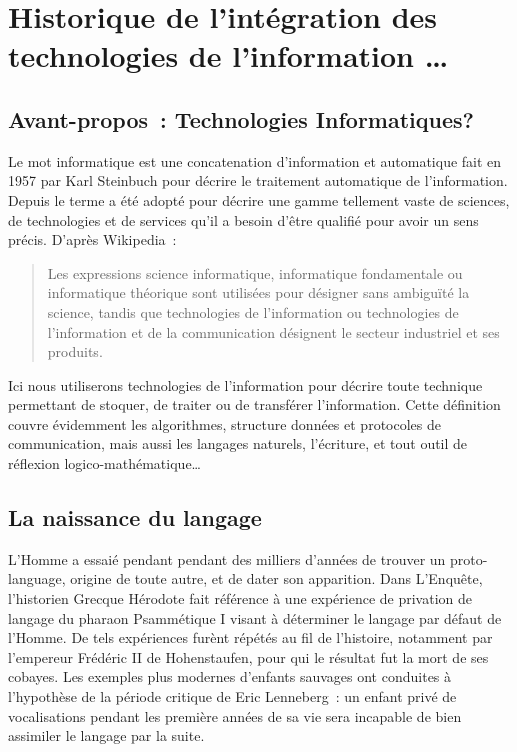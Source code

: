 
\chapter{Historique de l'intégration des technologies de l'information \ldots}\label{quoi}

\section{Avant-propos~: Technologies \og{}Informatiques\fg{}?}

Le mot \og{}informatique\fg{} est une concatenation d'\og{}information\fg{} et \og{}automatique\fg{} fait en 1957 par Karl Steinbuch\cite{steinbuch-2005} pour décrire le traitement automatique de l'information. 
Depuis le terme a été adopté pour décrire une gamme tellement vaste de sciences, de technologies et de services qu'il a besoin d'être qualifié pour avoir un sens précis. D'après Wikipedia\cite{wiki-informatique}~:
\begin{quote}
Les expressions \og{}science informatique\fg{}, \og{}informatique fondamentale\fg{} ou \og{}informatique théorique\fg{} sont utilisées pour désigner sans ambiguïté la science, tandis que \og{}technologies de l'information\fg{} ou \og{}technologies de l'information et de la communication\fg{} désignent le secteur industriel et ses produits.
\end{quote}
Ici nous utiliserons \og{}technologies de l'information\fg{} pour décrire toute technique permettant de stoquer, de traiter ou de transférer l'information. Cette définition couvre évidemment les algorithmes, structure données et protocoles de communication, mais aussi les langages naturels, l'écriture, et tout outil de réflexion logico-mathématique\ldots

\section{La naissance du langage}
L'Homme a essaié pendant pendant des milliers d'années de trouver un \og{}proto-language\fg{}, origine de toute autre, et de dater son apparition. Dans \og{}L'Enquête\fg{}, l'historien Grecque Hérodote fait référence à une expérience de \og{}privation de langage\fg{} du pharaon Psammétique I visant à déterminer le langage \og{}par défaut\fg{} de l'Homme\cite{herodote-privation}. De tels expériences furènt répétés au fil de l'histoire, notamment par l'empereur Frédéric II de Hohenstaufen, pour qui le résultat fut la mort de ses cobayes\cite{ggcoulton-francis-to-dante}. Les exemples plus modernes d'enfants \og{}sauvages\fg{} ont conduites à l'hypothèse de la \og{}période critique\fg{} de Eric Lenneberg\cite{lenneberg-crit-period}~: un enfant privé de vocalisations pendant les première années de sa vie sera incapable de bien assimiler le langage par la suite.

